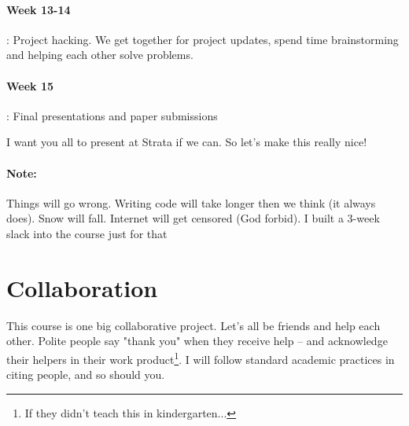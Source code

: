 \documentclass[12pt]{article}
\begin{document}
\paragraph{Week 13-14}: Project hacking. 
We get together for project updates, spend time brainstorming and helping each other solve problems. 

\paragraph{Week 15}: Final presentations and paper submissions

I want you all to present at Strata if we can. So let's make this really nice!


\paragraph{Note:} 
Things will go wrong. Writing code will take longer then we think (it always does). Snow will fall. Internet will get censored (God forbid). I built a 3-week slack into the course just for that


\section{Collaboration}

This course is one big collaborative project. Let's all be friends and help each other. Polite people say "thank you" when they receive help -- and acknowledge their helpers in their work product\footnote{If they didn't teach this in kindergarten...}. I will follow standard academic practices in citing people, and so should you. 
\end{document}
